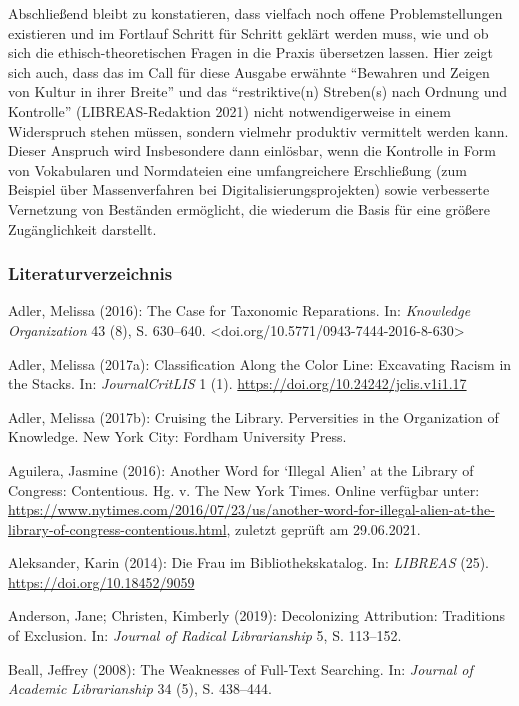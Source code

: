 \documentclass[a4paper,
fontsize=11pt,
oneside,
numbers=noperiodatend,
parskip=half-,
bibliography=totoc,
final
]{scrartcl}
\begin{document}
Abschließend bleibt zu konstatieren, dass vielfach noch offene
Problemstellungen existieren und im Fortlauf Schritt für Schritt geklärt
werden muss, wie und ob sich die ethisch-theoretischen Fragen in die
Praxis übersetzen lassen. Hier zeigt sich auch, dass das im Call für
diese Ausgabe erwähnte \enquote{Bewahren und Zeigen von Kultur in ihrer
Breite} und das \enquote{restriktive(n) Streben(s) nach Ordnung und
Kontrolle} (LIBREAS-Redaktion 2021) nicht notwendigerweise in einem
Widerspruch stehen müssen, sondern vielmehr produktiv vermittelt werden
kann. Dieser Anspruch wird Insbesondere dann einlösbar, wenn die
Kontrolle in Form von Vokabularen und Normdateien eine umfangreichere
Erschließung (zum Beispiel über Massenverfahren bei
Digitalisierungsprojekten) sowie verbesserte Vernetzung von Beständen
ermöglicht, die wiederum die Basis für eine größere Zugänglichkeit
darstellt.

\hypertarget{literaturverzeichnis}{%
\subsubsection{Literaturverzeichnis}\label{literaturverzeichnis}}

Adler, Melissa (2016): The Case for Taxonomic Reparations. In:
\emph{Knowledge Organization} 43 (8), S. 630--640.
\textless doi.org/10.5771/0943-7444-2016-8-630\textgreater{}

Adler, Melissa (2017a): Classification Along the Color Line: Excavating
Racism in the Stacks. In: \emph{JournalCritLIS} 1 (1).
\url{https://doi.org/10.24242/jclis.v1i1.17}

Adler, Melissa (2017b): Cruising the Library. Perversities in the
Organization of Knowledge. New York City: Fordham University Press.

Aguilera, Jasmine (2016): Another Word for \enquote*{Illegal Alien} at
the Library of Congress: Contentious. Hg. v. The New York Times. Online
verfügbar unter:
\url{https://www.nytimes.com/2016/07/23/us/another-word-for-illegal-alien-at-the-library-of-congress-contentious.html},
zuletzt \linebreak geprüft am 29.06.2021.

Aleksander, Karin (2014): Die Frau im Bibliothekskatalog. In:
\emph{LIBREAS} (25). \url{https://doi.org/10.18452/9059}

Anderson, Jane; Christen, Kimberly (2019): Decolonizing Attribution:
Traditions of Exclusion. In: \emph{Journal of Radical Librarianship} 5,
S. 113--152.

Beall, Jeffrey (2008): The Weaknesses of Full-Text Searching. In:
\emph{Journal of Academic Librarianship} 34 (5), S. 438--444.
\end{document}
